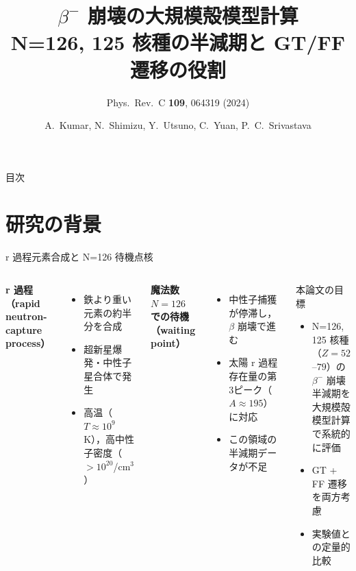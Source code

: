 \documentclass[aspectratio=169,12pt]{beamer}
\title[β崩壊 殻模型計算]{$\beta^-$ 崩壊の大規模殻模型計算\\
  \small N=126, 125 核種の半減期と GT/FF 遷移の役割}
\subtitle{Phys.\ Rev.\ C \textbf{109}, 064319 (2024)}
\author{A.~Kumar, N.~Shimizu, Y.~Utsuno, C.~Yuan, P.~C.~Srivastava}
\date{}
\begin{document}
\begin{frame}
  \titlepage
\end{frame}

\begin{frame}{目次}
  \tableofcontents
\end{frame}

\section{研究の背景}

\begin{frame}{r 過程元素合成と N=126 待機点核}
  \begin{columns}
    \textbf{r 過程（rapid neutron-capture process）}
    \begin{itemize}
      \item 鉄より重い元素の約半分を合成
      \item 超新星爆発・中性子星合体で発生
      \item 高温（$T \approx 10^9$ K），高中性子密度（$>10^{20}$/cm$^3$）
    \end{itemize}
    \vspace{0.5em}
    \textbf{魔法数 $N=126$ での待機（waiting point）}
    \begin{itemize}
      \item 中性子捕獲が停滞し，$\beta$ 崩壊で進む
      \item 太陽 r 過程存在量の第3ピーク（$A \approx 195$）に対応
      \item \alert{この領域の半減期データが不足}
    \end{itemize}

    \begin{block}{本論文の目標}
      \begin{itemize}
        \item N=126, 125 核種（$Z=52$--$79$）の\\
              $\beta^-$ 崩壊半減期を\\
              大規模殻模型計算で系統的に評価
        \item GT + FF 遷移を両方考慮
        \item 実験値との定量的比較
      \end{itemize}
    \end{block}
  \end{columns}
\end{frame}
\end{document}

